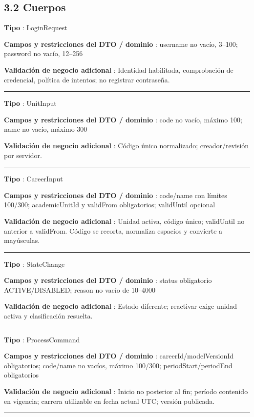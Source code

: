 \documentclass[12pt,a4paper]{report}
\begin{document}
\subsection{3.2 Cuerpos}\label{contrato-32-cuerpos}

\textbf{Tipo }: LoginRequest

\textbf{Campos y restricciones del DTO / dominio }: username no vacío,
3--100; password no vacío, 12--256

\textbf{Validación de negocio adicional }: Identidad habilitada,
comprobación de credencial, política de intentos; no registrar
contraseña.

\medskip\hrule\medskip

\textbf{Tipo }: UnitInput

\textbf{Campos y restricciones del DTO / dominio }: code no vacío,
máximo 100; name no vacío, máximo 300

\textbf{Validación de negocio adicional }: Código único normalizado;
creador/revisión por servidor.

\medskip\hrule\medskip

\textbf{Tipo }: CareerInput

\textbf{Campos y restricciones del DTO / dominio }: code/name con
límites 100/300; academicUnitId y validFrom obligatorios; validUntil
opcional

\textbf{Validación de negocio adicional }: Unidad activa, código único;
validUntil no anterior a validFrom. Código se recorta, normaliza
espacios y convierte a mayúsculas.

\medskip\hrule\medskip

\textbf{Tipo }: StateChange

\textbf{Campos y restricciones del DTO / dominio }: status obligatorio
ACTIVE/DISABLED; reason no vacío de 10--4000

\textbf{Validación de negocio adicional }: Estado diferente; reactivar
exige unidad activa y clasificación resuelta.

\medskip\hrule\medskip

\textbf{Tipo }: ProcessCommand

\textbf{Campos y restricciones del DTO / dominio
}: careerId/modelVersionId obligatorios; code/name no vacíos, máximo
100/300; periodStart/periodEnd obligatorios

\textbf{Validación de negocio adicional }: Inicio no posterior al fin;
período contenido en vigencia; carrera utilizable en fecha actual UTC;
versión publicada.

\medskip\hrule\medskip
\end{document}
